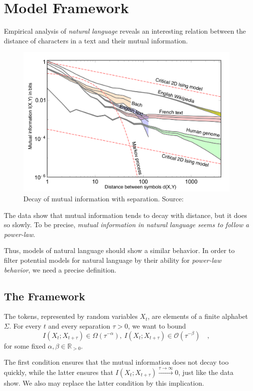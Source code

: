 \documentclass[../../main.tex]{subfiles}
\begin{document}
\chapter{Model Framework}
    Empirical analysis of \emph{natural language} reveals an interesting relation between the distance of characters in a text and their mutual information.

    \begin{figure}[h]
        \includegraphics*[width=\textwidth]{./natl_pl.png}
        \caption{Decay of mutual information with separation. Source: \cite{e19070299}}
    \end{figure}

    The data show that mutual information tends to decay with distance, but it does so slowly. To be precise, \emph{mutual information in natural language seems to follow a power-law}.

    Thus, models of natural language should show a similar behavior. In order to filter potential models for natural language by their ability for \emph{power-law behavior}, we need a precise definition.

\section{The Framework}
    The tokens, represented by random variables $X_t$, are elements of a finite alphabet $\Sigma$. For every $t$ and every separation $\tau > 0$, we want to bound
    \[
        I(X_t; X_{t + \tau}) \in \Omega(\tau^{-\alpha}), \ I(X_t; X_{t + \tau}) \in \mathcal{O}(\tau^{-\beta}) \quad ,
    \]
    for some fixed $\alpha, \beta \in \mathbb{R}_{>0}$. 
    
    The first condition ensures that the mutual information does not decay too quickly, while the latter ensures that $I(X_t; X_{t + \tau}) \xrightarrow{\tau \to \infty} 0$, just like the data show. We also may replace the latter condition by this implication.
\end{document}
